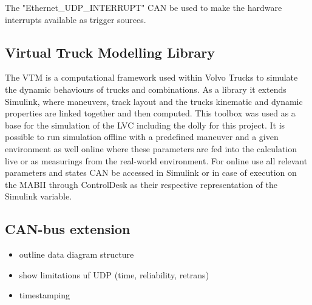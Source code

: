 \documentclass[ExampleMasters.tex]{subfiles}
\begin{document}
The "Ethernet\_UDP\_INTERRUPT" \gls{CAN} be used to make the hardware interrupts available as trigger sources.
\subsection{Virtual Truck Modelling Library}
\label{sec:VTM}
The \gls{VTM} is a computational framework used within Volvo Trucks to simulate the dynamic behaviours of trucks and combinations. As a library it extends Simulink, where maneuvers, track layout and the trucks kinematic and dynamic properties are linked together and then computed. This toolbox was used as a base for the simulation of the LVC including the dolly for this project. It is possible to run simulation offline with a predefined maneuver and a given environment as well online where these parameters are fed into the calculation live or as measurings from the real-world environment. For online use all relevant parameters and states \gls{CAN} be accessed in Simulink or in case of execution on the \gls{MABII} through ControlDesk as their respective representation of the Simulink variable. 

\subsection{CAN-bus extension}
\label{sec:can_bus_extension_software}

\begin{itemize}
	\item outline data diagram structure
	\item show limitations uf \gls{UDP} (time, reliability, retrans)
	\item timestamping
	
	
\end{itemize}
\end{document}
